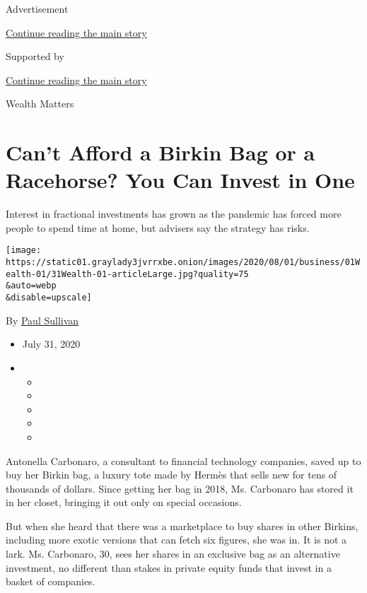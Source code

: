 Advertisement

\protect\hyperlink{after-top}{Continue reading the main story}

Supported by

\protect\hyperlink{after-sponsor}{Continue reading the main story}

Wealth Matters

\hypertarget{cant-afford-a-birkin-bag-or-a-racehorse-you-can-invest-in-one}{%
\section{Can't Afford a Birkin Bag or a Racehorse? You Can Invest in
One}\label{cant-afford-a-birkin-bag-or-a-racehorse-you-can-invest-in-one}}

Interest in fractional investments has grown as the pandemic has forced
more people to spend time at home, but advisers say the strategy has
risks.

\texttt{[image: https://static01.graylady3jvrrxbe.onion/images/2020/08/01/business/01Wealth-01/31Wealth-01-articleLarge.jpg?quality=75\\\&auto=webp\\\&disable=upscale]}

By \href{https://www.nytimes3xbfgragh.onion/by/paul-sullivan}{Paul
Sullivan}

\begin{itemize}
\item
  July 31, 2020
\item
  \begin{itemize}
  \item
  \item
  \item
  \item
  \item
  \end{itemize}
\end{itemize}

Antonella Carbonaro, a consultant to financial technology companies,
saved up to buy her Birkin bag, a luxury tote made by Hermès that sells
new for tens of thousands of dollars. Since getting her bag in 2018, Ms.
Carbonaro has stored it in her closet, bringing it out only on special
occasions.

But when she heard that there was a marketplace to buy shares in other
Birkins, including more exotic versions that can fetch six figures, she
was in. It is not a lark. Ms. Carbonaro, 30, sees her shares in an
exclusive bag as an alternative investment, no different than stakes in
private equity funds that invest in a basket of companies.

